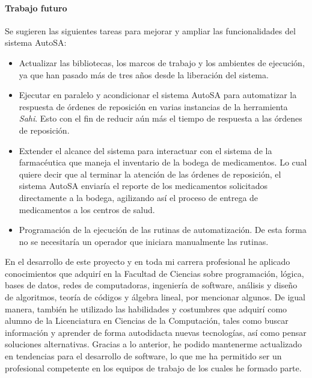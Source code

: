 \paragraph{Trabajo futuro\\}
Se sugieren las siguientes tareas para mejorar y ampliar las funcionalidades del sistema AutoSA:
\begin{itemize}
	\item Actualizar las bibliotecas, los marcos de trabajo y los ambientes de ejecución, ya que han pasado más de tres años desde la liberación del sistema.
	\item Ejecutar en paralelo y acondicionar el sistema AutoSA para automatizar la respuesta de órdenes de reposición en varias instancias de la herramienta \textit{Sahi}. Esto con el fin de reducir aún más el tiempo de respuesta a las órdenes de reposición.
	\item Extender el alcance del sistema para interactuar con el sistema de la farmacéutica que maneja el inventario de la bodega de medicamentos. Lo cual quiere decir que al terminar la atención de las órdenes de reposición, el sistema AutoSA enviaría el reporte de los medicamentos solicitados directamente a la bodega, agilizando así el proceso de entrega de medicamentos a los centros de salud. 
	\item Programación de la ejecución de las rutinas de automatización. De esta forma no se necesitaría un operador que iniciara manualmente las rutinas.
\end{itemize}
\pagebreak
En el desarrollo de este proyecto y en toda mi carrera profesional he aplicado conocimientos que adquirí en la Facultad de Ciencias sobre programación, lógica, bases de datos, redes de computadoras, ingeniería de software, análisis y diseño de algoritmos, teoría de códigos y álgebra lineal, por mencionar algunos. De igual manera, también he utilizado las habilidades y costumbres que adquirí como alumno de la Licenciatura en Ciencias de la Computación, tales como buscar información y aprender de forma autodidacta nuevas tecnologías, así como pensar soluciones alternativas. Gracias a lo anterior, he podido mantenerme actualizado en tendencias para el desarrollo de software, lo que me ha permitido ser un profesional competente en los equipos de trabajo de los cuales he formado parte.\\
